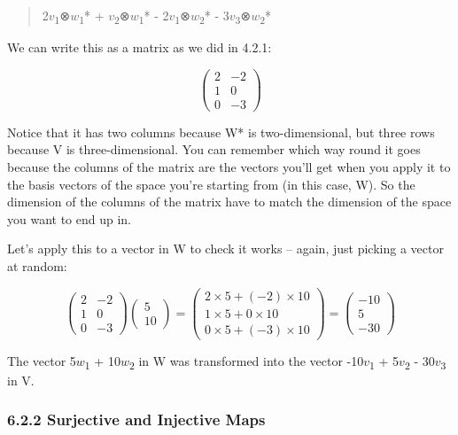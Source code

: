 \documentclass[oneside,english]{amsbook}
\numberwithin{section}{chapter}
\theoremstyle{plain}
\theoremstyle{definition}
\begin{document}
\begin{quote}
	2$v$\textsubscript{1}⊗$w$\textsubscript{1}* +
	$v$\textsubscript{2}⊗$w$\textsubscript{1}* -
	2$v$\textsubscript{1}⊗$w$\textsubscript{2}* -
	3$v$\textsubscript{3}⊗$w$\textsubscript{2}*
\end{quote}

We can write this as a matrix as we did in 4.2.1:

\[\begin{pmatrix}
	2 & - 2 \\
	1 & 0 \\
	0 & - 3
\end{pmatrix}\]

Notice that it has two columns because W* is two-dimensional, but three
rows because V is three-dimensional. You can remember which way round it
goes because the columns of the matrix are the vectors you'll get when
you apply it to the basis vectors of the space you're starting from (in
this case, W). So the dimension of the columns of the matrix have to
match the dimension of the space you want to end up in.

Let's apply this to a vector in W to check it works -- again, just
picking a vector at random:

\[\begin{pmatrix}
	2 & - 2 \\
	1 & 0 \\
	0 & - 3
\end{pmatrix}\begin{pmatrix}
	5 \\
	10
\end{pmatrix} = \begin{pmatrix}
	2 \times 5 + ( - 2) \times 10 \\
	1 \times 5 + 0 \times 10 \\
	0 \times 5 + ( - 3) \times 10
\end{pmatrix} = \begin{pmatrix}
	- 10 \\
	5 \\
	- 30
\end{pmatrix}\]

The vector 5$w$\textsubscript{1} + 10$w$\textsubscript{2} in W was
transformed into the vector -10$v$\textsubscript{1} +
5$v$\textsubscript{2} - 30$v$\textsubscript{3} in V.

\subsubsection{6.2.2 Surjective and Injective
	Maps}\label{surjective-and-injective-maps}
\end{document}
